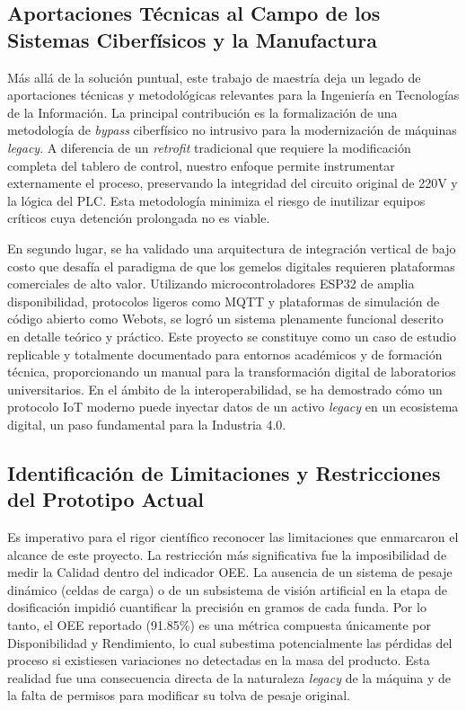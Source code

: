 \subsection{Aportaciones Técnicas al Campo de los Sistemas Ciberfísicos y la Manufactura}
Más allá de la solución puntual, este trabajo de maestría deja un legado de aportaciones técnicas y metodológicas relevantes para la Ingeniería en Tecnologías de la Información. La principal contribución es la formalización de una metodología de \textit{bypass} ciberfísico no intrusivo para la modernización de máquinas \textit{legacy}. A diferencia de un \textit{retrofit} tradicional que requiere la modificación completa del tablero de control, nuestro enfoque permite instrumentar externamente el proceso, preservando la integridad del circuito original de 220V y la lógica del PLC. Esta metodología minimiza el riesgo de inutilizar equipos críticos cuya detención prolongada no es viable.

En segundo lugar, se ha validado una arquitectura de integración vertical de bajo costo que desafía el paradigma de que los gemelos digitales requieren plataformas comerciales de alto valor. Utilizando microcontroladores ESP32 de amplia disponibilidad, protocolos ligeros como MQTT y plataformas de simulación de código abierto como Webots, se logró un sistema plenamente funcional descrito en detalle teórico y práctico. Este proyecto se constituye como un caso de estudio replicable y totalmente documentado para entornos académicos y de formación técnica, proporcionando un manual para la transformación digital de laboratorios universitarios. En el ámbito de la interoperabilidad, se ha demostrado cómo un protocolo IoT moderno puede inyectar datos de un activo \textit{legacy} en un ecosistema digital, un paso fundamental para la Industria 4.0.

\subsection{Identificación de Limitaciones y Restricciones del Prototipo Actual}
Es imperativo para el rigor científico reconocer las limitaciones que enmarcaron el alcance de este proyecto. La restricción más significativa fue la imposibilidad de medir la Calidad dentro del indicador OEE. La ausencia de un sistema de pesaje dinámico (celdas de carga) o de un subsistema de visión artificial en la etapa de dosificación impidió cuantificar la precisión en gramos de cada funda. Por lo tanto, el OEE reportado (91.85\%) es una métrica compuesta únicamente por Disponibilidad y Rendimiento, lo cual subestima potencialmente las pérdidas del proceso si existiesen variaciones no detectadas en la masa del producto. Esta realidad fue una consecuencia directa de la naturaleza \textit{legacy} de la máquina y de la falta de permisos para modificar su tolva de pesaje original.

